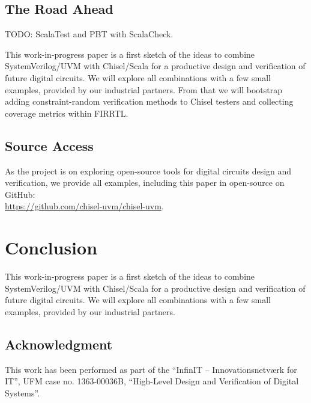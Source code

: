 \documentclass[conference]{IEEEtran}
\newcommand{\todo}[1]{{\color{olive} TODO: #1}}
\begin{document}
\subsection{The Road Ahead}

\todo{ScalaTest and PBT with ScalaCheck.}

This work-in-progress paper is a first sketch of the ideas to combine SystemVerilog/UVM
with Chisel/Scala for a productive design and verification of future digital circuits.
We will explore all combinations with a few small examples, provided by our industrial
partners.
From that we will bootstrap adding constraint-random verification methods to Chisel
testers and collecting coverage metrics within FIRRTL.

\subsection{Source Access}

As the project is on exploring open-source tools for digital circuits design
and verification, we provide all examples, including this paper in open-source
on GitHub:\\ \url{https://github.com/chisel-uvm/chisel-uvm}.


\section{Conclusion}
\label{sec:conclusion}

This work-in-progress paper is a first sketch of the ideas to combine SystemVerilog/UVM
with Chisel/Scala for a productive design and verification of future digital circuits.
We will explore all combinations with a few small examples, provided by our industrial
partners.


\subsection*{Acknowledgment}

This work has been performed as part of the
``InfinIT -- Innovationsnetv{\ae}rk for IT'', UFM case no. 1363-00036B,
``High-Level Design and Verification of Digital Systems''.







\end{document}
